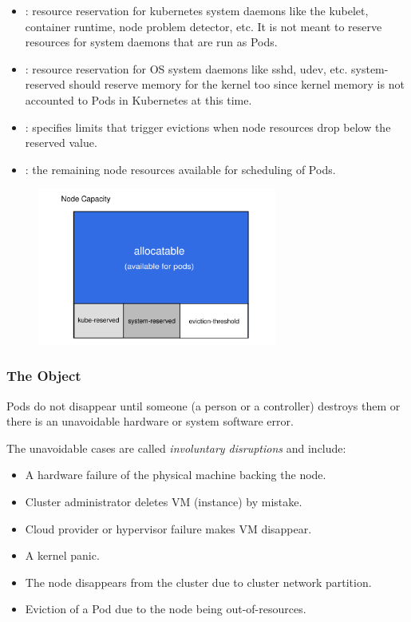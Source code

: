 \begin{itemize}
	\item {}: resource reservation for kubernetes system daemons
	      like the kubelet, container runtime, node problem detector, etc. It is
	      not meant to reserve resources for system daemons that are run as
	      Pods.
	\item {}: resource reservation for OS system daemons like
	      sshd, udev, etc. system-reserved should reserve memory for the kernel
	      too since kernel memory is not accounted to Pods in Kubernetes at this
	      time.
	\item {}: specifies limits that trigger evictions when
	      node resources drop below the reserved value.
	\item {}: the remaining node resources available for
	      scheduling of Pods.
\end{itemize}

\begin{figure}
	\centering
	\includegraphics[width=0.7\textwidth]{resources/node-capacity.png}
	\label{fig:test1}
\end{figure}

\subsubsection{The  Object}
\label{section:Pod-disruption-budge}

Pods do not disappear until someone (a person or a controller) destroys them or
there is an unavoidable hardware or system software error.

The unavoidable cases are called \emph{involuntary disruptions} and include:
\begin{itemize}
	\tightlist
	\item A hardware failure of the physical machine backing the node.
	\item Cluster administrator deletes VM (instance) by mistake.
	\item Cloud provider or hypervisor failure makes VM disappear.
	\item A kernel panic.
	\item The node disappears from the cluster due to cluster network partition.
	\item Eviction of a Pod due to the node being out-of-resources.
\end{itemize}

